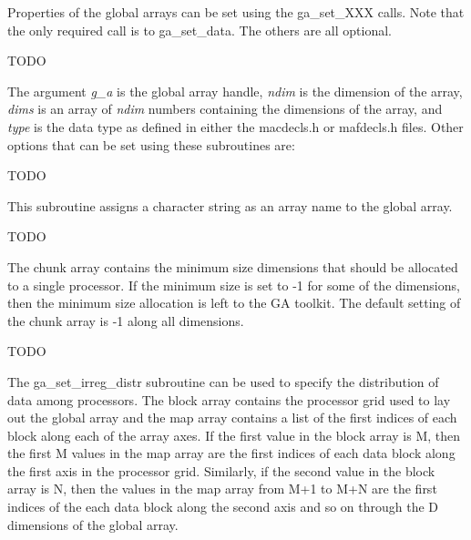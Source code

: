 Properties of the global arrays can be set using the ga\_set\_XXX
calls. Note that the only required call is to ga\_set\_data. The others
are all optional.

TODO
%

The argument \emph{g\_a} is the global array handle, \emph{ndim} is the
dimension of the array, \emph{dims} is an array of \emph{ndim} numbers
containing the dimensions of the array, and \emph{type} is the data type as
defined in either the macdecls.h or mafdecls.h files.  Other options that can
be set using these subroutines are:

TODO
%

This subroutine assigns a character string as an array name to the
global array.

TODO
%

The chunk array contains the minimum size dimensions that should be allocated
to a single processor. If the minimum size is set to -1 for some of the
dimensions, then the minimum size allocation is left to the GA toolkit. The
default setting of the chunk array is -1 along all dimensions.

TODO
%

The ga\_set\_irreg\_distr subroutine can be used to specify the distribution of
data among processors. The block array contains the processor grid used to lay
out the global array and the map array contains a list of the first indices of
each block along each of the array axes. If the first value in the block array
is M, then the first M values in the map array are the first indices of each
data block along the first axis in the processor grid. Similarly, if the second
value in the block array is N, then the values in the map array from M+1 to M+N
are the first indices of the each data block along the second axis and so on
through the D dimensions of the global array.


